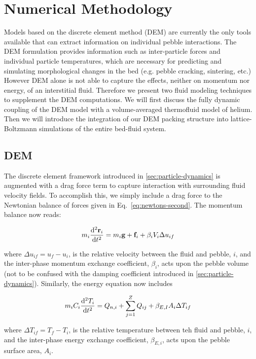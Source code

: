 \section{Numerical Methodology}
Models based on the discrete element method (DEM) are currently the only tools available that can extract information on individual pebble interactions. The DEM formulation provides information such as inter-particle forces and individual particle temperatures, which are necessary for predicting and simulating morphological changes in the bed (e.g. pebble cracking, sintering, etc.) However DEM alone is not able to capture the effects, neither on momentum nor energy, of an interstitial fluid. Therefore we present two fluid modeling techniques to supplement the DEM computations. We will first discuss the fully dynamic coupling of the DEM model with a volume-averaged thermofluid model of helium. Then we will introduce the integration of our DEM packing structure into lattice-Boltzmann simulations of the entire bed-fluid system.

\subsection{DEM}\label{sec:cfdem-heat-transfer}
The discrete element framework introduced in \cref{sec:particle-dynamics} is augmented with a drag force term to capture interaction with surrounding fluid velocity fields. To accomplish this, we simply include a drag force to the Newtonian balance of forces given in Eq.~\ref{eq:newtons-second}. The momentum balance now reads:

\begin{equation}\label{eq:cfdem-dem-momentum}
	m_i  \frac{\mathrm{d}^2{\mathbf{r}_i}}{\mathrm{d}t^2} = m_i\mathbf{g} + \mathbf{f}_i + \beta_i V_i \Delta u_{if}
\end{equation}

where $\Delta u_{if} = u_f - u_i$, is the relative velocity between the fluid and pebble, $i$, and the inter-phase momentum exchange coefficient, $\beta_i$, acts upon the pebble volume (not to be confused with the damping coefficient introduced in \cref{sec:particle-dynamics}). Similarly, the energy equation now includes 

\begin{equation}\label{eq:cfdem-dem-energy}
	m_iC_i \frac{\mathrm{d}^2{T_i}}{\mathrm{d}t^2} = Q_{n,i} + \sum_{j=1}^Z Q_{ij} + \beta_{E,I} A_i \Delta T_{if}
\end{equation}

where $\Delta T_{if} = T_f - T_i$, is the relative temperature between teh fluid and pebble, $i$, and the inter-phase energy exchange coefficient, $\beta_{E,i}$, acts upon the pebble surface area, $A_i$.

